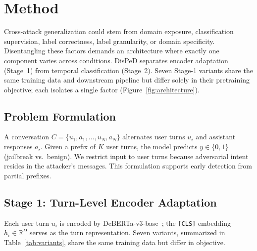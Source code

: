 
\section{Method}
\label{sec:method}

Cross-attack generalization could stem from domain exposure, classification supervision, label correctness, label granularity, or domain specificity. Disentangling these factors demands an architecture where exactly one component varies across conditions. DisPeD separates encoder adaptation (Stage~1) from temporal classification (Stage~2). Seven Stage-1 variants share the same training data and downstream pipeline but differ solely in their pretraining objective; each isolates a single factor (Figure~\ref{fig:architecture}).

\subsection{Problem Formulation}

A conversation $C = \{u_1, a_1, \ldots, u_N, a_N\}$ alternates user turns $u_i$ and assistant responses $a_i$. Given a prefix of $K$ user turns, the model predicts $y \in \{0, 1\}$ (jailbreak vs.\ benign). We restrict input to user turns because adversarial intent resides in the attacker's messages. This formulation supports early detection from partial prefixes.

\subsection{Stage 1: Turn-Level Encoder Adaptation}

Each user turn $u_i$ is encoded by DeBERTa-v3-base~\citep{he2023debertav3}; the \texttt{[CLS]} embedding $h_i \in \mathbb{R}^D$ serves as the turn representation. Seven variants, summarized in Table~\ref{tab:variants}, share the same training data but differ in objective.

